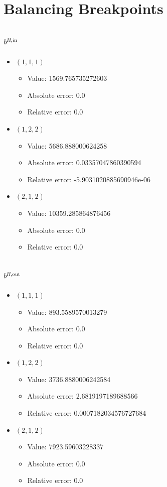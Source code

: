 \documentclass{article}%
\begin{document}
\section{Balancing Breakpoints}%
\subsection{$b^{\textsl{H},\text{in}}$}%
\begin{itemize}%
	\item $(1, 1, 1)$%
	\begin{itemize}%
		\item Value: 1569.765735272603%
		\item Absolute error: 0.0%
		\item Relative error: 0.0%
	\end{itemize}%
	\item $(1, 2, 2)$%
	\begin{itemize}%
		\item Value: 5686.888000624258%
		\item Absolute error: 0.03357047860390594%
		\item Relative error: -5.9031020885690946e-06%
	\end{itemize}%
	\item $(2, 1, 2)$%
	\begin{itemize}%
		\item Value: 10359.285864876456%
		\item Absolute error: 0.0%
		\item Relative error: 0.0%
	\end{itemize}%
\end{itemize}%
\subsection{$b^{\textsl{H},\text{out}}$}%
\begin{itemize}%
	\item $(1, 1, 1)$%
	\begin{itemize}%
		\item Value: 893.5589570013279%
		\item Absolute error: 0.0%
		\item Relative error: 0.0%
	\end{itemize}%
	\item $(1, 2, 2)$%
	\begin{itemize}%
		\item Value: 3736.8880006242584%
		\item Absolute error: 2.6819197189688566%
		\item Relative error: 0.0007182034576727684%
	\end{itemize}%
	\item $(2, 1, 2)$%
	\begin{itemize}%
		\item Value: 7923.59603228337%
		\item Absolute error: 0.0%
		\item Relative error: 0.0%
	\end{itemize}%
\end{itemize}%
\end{document}
